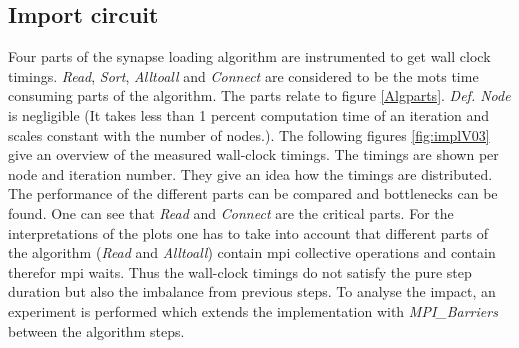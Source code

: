 \subsection{Import circuit}
Four parts of the synapse loading algorithm are instrumented to get wall clock timings.
\emph{Read}, \emph{Sort}, \emph{Alltoall} and \emph{Connect} are considered to be the mots time
consuming parts of the algorithm. The parts relate to figure \ref{Algparts}.
\emph{Def. Node} is negligible (It takes less than 1 percent computation time of an iteration and scales constant with the number of nodes.).
The following figures \ref{fig:implV03} give an overview of the measured wall-clock timings.
The timings are shown per node and iteration number. They give an idea how the timings are distributed.
The performance of the different parts can be compared and bottlenecks can be found.
One can see that \emph{Read} and \emph{Connect} are the critical parts.
For the interpretations of the plots one has to take into account that different parts of the algorithm
(\emph{Read} and \emph{Alltoall}) contain mpi collective operations and contain therefor mpi waits.
Thus the wall-clock timings do not satisfy the pure step duration but also the imbalance from previous steps.
To analyse the impact, an experiment is performed which extends the implementation with \emph{MPI\_Barriers}
between the algorithm steps.
\newpage
